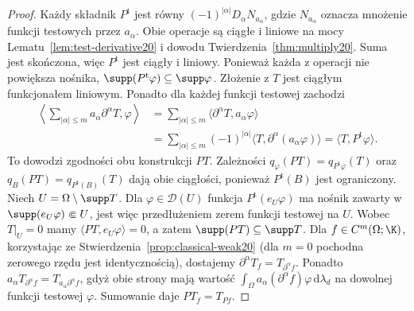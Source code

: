 \begin{proof}
Każdy składnik $P^{\mathrm t}$ jest równy
$(-1)^{|\alpha|}D_\alpha N_{a_\alpha}$, gdzie
$N_{a_\alpha}$ oznacza mnożenie funkcji testowych przez
$a_\alpha$. Obie operacje są ciągłe i liniowe na mocy
Lematu~\ref{lem:test-derivative20} i dowodu
Twierdzenia~\ref{thm:multiply20}. Suma jest skończona,
więc $P^{\mathrm t}$ jest ciągły i liniowy.
Ponieważ każda z operacji nie powiększa nośnika,
$\supp(P^{\mathrm t}\varphi)\subseteq\supp\varphi$.
Złożenie z $T$ jest ciągłym funkcjonałem liniowym.
Ponadto dla każdej funkcji testowej zachodzi
\[
\begin{aligned}
\left\langle\sum_{|\alpha|\le m}a_\alpha\partial^\alpha T,
\varphi\right\rangle
&=\sum_{|\alpha|\le m}\langle\partial^\alpha T,
a_\alpha\varphi\rangle\\
&=\sum_{|\alpha|\le m}(-1)^{|\alpha|}
\langle T,\partial^\alpha(a_\alpha\varphi)\rangle
=\langle T,P^{\mathrm t}\varphi\rangle.
\end{aligned}
\]
To dowodzi zgodności obu konstrukcji $PT$.
Zależności
$q_\varphi(PT)=q_{P^{\mathrm t}\varphi}(T)$ oraz
$q_B(PT)=q_{P^{\mathrm t}(B)}(T)$
dają obie ciągłości, ponieważ $P^{\mathrm t}(B)$ jest ograniczony.
Niech $U=\Omega\setminus\supp T$. Dla
$\varphi\in\mathcal D(U)$ funkcja $P^{\mathrm t}(e_U\varphi)$
ma nośnik zawarty w $\supp(e_U\varphi)\Subset U$,
jest więc przedłużeniem zerem funkcji testowej na $U$.
Wobec $T|_U=0$ mamy $\langle PT,e_U\varphi\rangle=0$,
a zatem $\supp(PT)\subseteq\supp T$.
Dla $f\in C^m(\Omega;\K)$, korzystając ze
Stwierdzenia~\ref{prop:classical-weak20} (dla $m=0$
pochodna zerowego rzędu jest identycznością), dostajemy
$\partial^\alpha T_f=T_{\partial^\alpha f}$.
Ponadto $a_\alpha T_{\partial^\alpha f}
=T_{a_\alpha\partial^\alpha f}$, gdyż obie strony mają
wartość $\int_\Omega a_\alpha(\partial^\alpha f)\varphi\,
\mathrm d\lambda_d$ na dowolnej funkcji testowej $\varphi$.
Sumowanie daje $PT_f=T_{Pf}$.


\end{proof}
